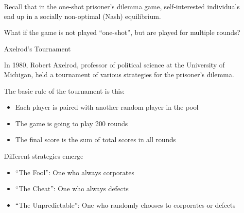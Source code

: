 \begin{frame}{}
\protect\hypertarget{section-39}{}

Recall that in the one-shot prisoner's dilemma game, self-interested
individuals end up in a socially non-optimal (Nash) equilibrium.

What if the game is not played ``one-shot'', but are played for multiple
rounds?

\end{frame}

\begin{frame}{Axelrod's Tournament}
\protect\hypertarget{axelrods-tournament}{}

In 1980, Robert Axelrod, professor of political science at the
University of Michigan, held a tournament of various strategies for the
prisoner's dilemma.

The basic rule of the tournament is this:

\begin{itemize}
\tightlist
\item
  Each player is paired with another random player in the pool
\item
  The game is going to play 200 rounds
\item
  The final score is the sum of total scores in all rounds
\end{itemize}

\end{frame}

\begin{frame}{Different strategies emerge}
\protect\hypertarget{different-strategies-emerge}{}

\begin{itemize}
\tightlist
\item
  ``The Fool'': One who always corporates
\item
  ``The Cheat'': One who always defects
\item
  ``The Unpredictable'': One who randomly chooses to corporates or
  defects
\end{itemize}

\end{frame}

